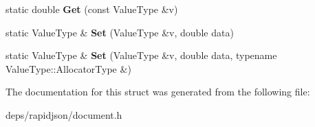 \begin{DoxyCompactItemize}
\item 
static double {\bfseries Get} (const Value\+Type \&v)\hypertarget{structinternal_1_1_type_helper_3_01_value_type_00_01double_01_4_ac55a96d2abd1dd6718a6cb3d6690aa38}{}\label{structinternal_1_1_type_helper_3_01_value_type_00_01double_01_4_ac55a96d2abd1dd6718a6cb3d6690aa38}

\item 
static Value\+Type \& {\bfseries Set} (Value\+Type \&v, double data)\hypertarget{structinternal_1_1_type_helper_3_01_value_type_00_01double_01_4_a2b332dd6083278283289e107caff879b}{}\label{structinternal_1_1_type_helper_3_01_value_type_00_01double_01_4_a2b332dd6083278283289e107caff879b}

\item 
static Value\+Type \& {\bfseries Set} (Value\+Type \&v, double data, typename Value\+Type\+::\+Allocator\+Type \&)\hypertarget{structinternal_1_1_type_helper_3_01_value_type_00_01double_01_4_a69f7d942a569f3acdeb64127b2ecd9eb}{}\label{structinternal_1_1_type_helper_3_01_value_type_00_01double_01_4_a69f7d942a569f3acdeb64127b2ecd9eb}

\end{DoxyCompactItemize}


The documentation for this struct was generated from the following file\+:\begin{DoxyCompactItemize}
\item 
deps/rapidjson/document.\+h\end{DoxyCompactItemize}
